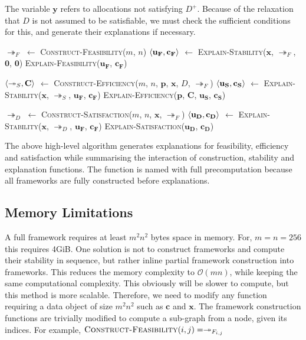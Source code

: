 The variable $\mathbf{y}$ refers to allocations not satisfying $D^+$. Because of the relaxation that $D$ is not assumed to be satisfiable, we must check the sufficient conditions for this, and generate their explanations if necessary.

\begin{algorithm}[H]
	\caption{}
	\begin{algorithmic}[1]
			\State $\twoheadrightarrow_F$ $\gets$ \textsc{Construct-Feasibility}($m$, $n$)
			\State $\langle{\mathbf{u_F}},{\mathbf{c_F}}\rangle$ $\gets$ \textsc{Explain-Stability}($\mathbf{x}$, $\twoheadrightarrow_F$, $\mathbf{0}$, $\mathbf{0}$)
			\State\textsc{Explain-Feasibility}($\mathbf{u_F}$, $\mathbf{c_F}$)

			\State $\langle{\twoheadrightarrow_S},{\mathbf{C}}\rangle$ $\gets$ \textsc{Construct-Efficiency}($m$, $n$, $\mathbf{p}$, $\mathbf{x}$, $D$, $\twoheadrightarrow_F$)
			\State $\langle{\mathbf{u_S}},{\mathbf{c_S}}\rangle$ $\gets$ \textsc{Explain-Stability}($\mathbf{x}$, $\twoheadrightarrow_S$, $\mathbf{u_F}$, $\mathbf{c_F}$)
			\State\textsc{Explain-Efficiency}($\mathbf{p}$, $\mathbf{C}$, $\mathbf{u_S}$, $\mathbf{c_S}$)

			\State $\twoheadrightarrow_D$ $\gets$ \textsc{Construct-Satisfaction}($m$, $n$, $\mathbf{x}$, $\twoheadrightarrow_F$)
			\State $\langle{\mathbf{u_D}},{\mathbf{c_D}}\rangle$ $\gets$ \textsc{Explain-Stability}($\mathbf{x}$, $\twoheadrightarrow_D$, $\mathbf{u_F}$, $\mathbf{c_F}$)
			\State\textsc{Explain-Satisfaction}($\mathbf{u_D}$, $\mathbf{c_D}$)
		\EndFunction
	\end{algorithmic}
\end{algorithm}

The above high-level algorithm generates explanations for feasibility, efficiency and satisfaction while summarising the interaction of construction, stability and explanation functions. The function is named with full precomputation because all frameworks are fully constructed before explanations.

\subsection{Memory Limitations}

A full framework requires at least $m^2n^2$ bytes space in memory. For, $m=n=256$ this requires 4GiB. One solution is not to construct frameworks and compute their stability in sequence, but rather inline partial framework construction into frameworks. This reduces the memory complexity to $\mathcal{O}(mn)$, while keeping the same computational complexity. This obviously will be slower to compute, but this method is more scalable. Therefore, we need to modify any function requiring a data object of size $m^2n^2$ such as $\mathbf{c}$ and $\mathbf{x}$.
\linespace
The framework construction functions are trivially modified to compute a sub-graph from a node, given its indices. For example, $\textsc{Construct-Feasibility}(i,j)=\twoheadrightarrow_{F_{i,j}}$

